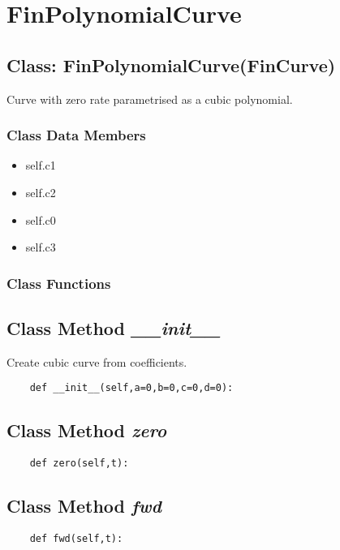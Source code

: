 \documentclass[twoside,11pt]{book}
\begin{document}
\newpage
\section{FinPolynomialCurve}

\subsection{Class: FinPolynomialCurve(FinCurve)}
Curve with zero rate parametrised as a cubic polynomial. 

\subsubsection{Class Data Members}
\begin{itemize}
\item{self.c1}
\item{self.c2}
\item{self.c0}
\item{self.c3}
\end{itemize}

\subsubsection{Class Functions}

\subsection{Class Method {\it \_\_init\_\_}}
Create cubic curve from coefficients. 

\begin{lstlisting}
    def __init__(self,a=0,b=0,c=0,d=0):
\end{lstlisting}

\subsection{Class Method {\it zero}}


\begin{lstlisting}
    def zero(self,t):
\end{lstlisting}

\subsection{Class Method {\it fwd}}


\begin{lstlisting}
    def fwd(self,t):
\end{lstlisting}
\end{document}
